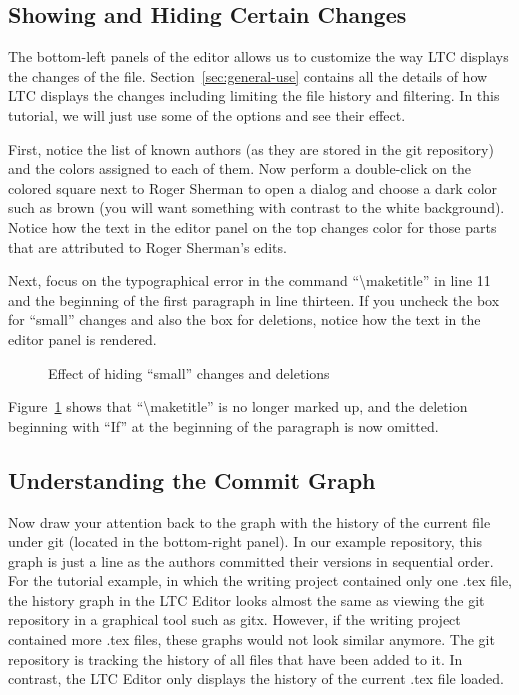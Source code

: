 \subsection{Showing and Hiding Certain Changes}

The bottom-left panels of the editor allows us to customize the way LTC displays the changes of the file.  Section~\ref{sec:general-use} contains all the details of how LTC displays the changes including limiting the file history and filtering.  In this tutorial, we will just use some of the options and see their effect.

First, notice the list of known authors (as they are stored in the git repository) and the colors assigned to each of them.  Now perform a double-click on the colored square next to Roger Sherman to open a dialog and  choose a dark color such as brown (you will want something with contrast to the white background).  Notice how the text in the editor panel on the top changes color for those parts that are attributed to Roger Sherman's edits.

Next, focus on the typographical error in the command ``\textbackslash maketitle'' in line 11 and the beginning of the first paragraph in line thirteen.  If you uncheck the box for ``small'' changes and also the box for deletions, notice how the text in the editor panel is rendered.
\begin{figure}[t]
\centering
{}
\hspace{2ex}
\hspace{2ex}
\caption{Effect of hiding ``small'' changes and deletions} \label{fig:editor-filter-small}
\end{figure}
Figure~\ref{fig:editor-filter-small} shows that ``\textbackslash maketitle'' is no longer marked up, and the deletion beginning with ``If'' at the beginning of the paragraph is now omitted.

\subsection{Understanding the Commit Graph}

Now draw your attention back to the graph with the history of the current file under git (located in the bottom-right panel).  In our example repository, this graph is just a line as the authors committed their versions in sequential order.  For the tutorial example, in which the writing project contained only one .tex file, the history graph in the LTC Editor looks almost the same as viewing the git repository in a graphical tool such as gitx.  However, if the writing project contained more .tex files, these graphs would not look similar anymore.  The git repository is tracking the history of all files that have been added to it.  In contrast, the LTC Editor only displays the history of the current .tex file loaded.

